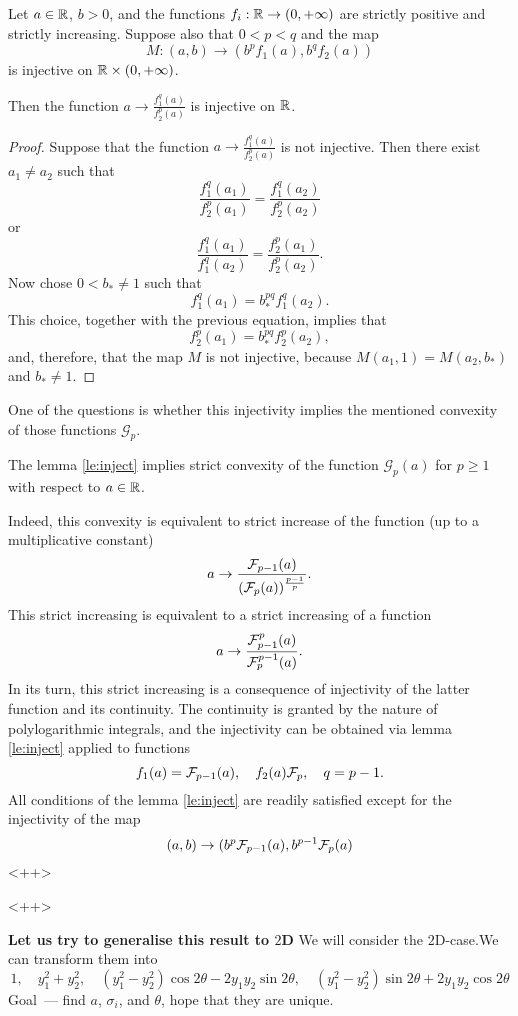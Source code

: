 \documentclass{article}
\begin{document}
\begin{lemma}
	Let $a\in{\mathbb R}$, $b>0$, and the functions $f_i:{\mathbb R}\to(0,+\infty)$ are strictly positive and strictly increasing. Suppose also that $0<p<q$ and the map
	\[
		M:(a,b)\to (b^pf_1(a),b^q f_2(a))
	\]
	is injective on ${\mathbb R}\times(0,+\infty)$.

	Then the function $a\to \frac{f_1^q(a)}{f_2^p(a)}$ is injective on ${\mathbb R}$.
	\label{le:inject}
\end{lemma}
\begin{proof}
	Suppose that the function $a\to \frac{f_1^q(a)}{f_2^p(a)}$ is not injective. Then there exist $a_1\ne a_2$ such that
	\[
		\frac{f_1^q(a_1)}{f_2^p(a_1)}=\frac{f_1^q(a_2)}{f_2^p(a_2)}
	\]
	or
	\[
		\frac{f_1^q(a_1)}{f_1^q(a_2)}=\frac{f_2^p(a_1)}{f_2^p(a_2)}.
	\]
	Now chose $0<b_*\ne1$ such that 
	\[
		f_1^q(a_1) = b_*^{pq}f_1^{q}(a_2).
	\]
	This choice, together with the previous equation, implies that
	\[
		f_2^p(a_1) = b_*^{pq}f_2^p(a_2),
	\]
	and, therefore, that the map $M$ is not injective, because $M(a_1,1)=M(a_2,b_*)$ and $b_*\ne 1$.


\end{proof}

One of the questions is whether this injectivity implies the mentioned convexity of those functions $\mathcal G_p$.

\begin{corollary}
	The lemma \ref{le:inject} implies strict convexity of the function $\mathcal G_p(a)$ for $p\ge 1$ with respect to $a\in {\mathbb R}$.

	Indeed, this convexity is equivalent to strict increase of the function (up to a multiplicative constant) 
	\[
		a\to\frac{\mathcal F_{p-1}(a)}{(\mathcal F_{p}(a))^{\frac{p-1}{p}}}.
	\]
	This strict increasing is equivalent to a strict increasing of a function
\[
	a\to\frac{\mathcal F^{p}_{p-1}(a)}{\mathcal F_{p}^{p-1}(a)}.
	\]
	In its turn, this strict increasing is a consequence of injectivity of the latter function and its continuity.
	The continuity is granted by the nature of polylogarithmic integrals, and the injectivity can be obtained via lemma \ref{le:inject} applied to functions
	\[
		f_1(a)=\mathcal F_{p-1}(a),\quad f_2(a)\mathcal F_{p},\quad q=p-1.
	\]
	All conditions of the lemma \ref{le:inject} are readily satisfied except for the injectivity of the map \[
		(a,b)\to(b^p\mathcal F_{p-1}(a),b^{p-1}\mathcal F_{p}(a)
	\]<++>
\end{corollary}<++>


\textbf{Let us try to generalise this result to $2$D}
We will consider the $2$D-case.We can transform them into
\[
	1,\quad  y_1^2+y_2^2,\quad  (y_1^2-y_2^2)\cos2\theta-2y_1y_2\sin 2\theta, \quad (y_1^2-y_2^2)\sin2\theta+2y_1y_2\cos2\theta
\]
Goal~--- find $a$, $\sigma_i$, and $\theta$, hope that they are unique.
\end{document}
